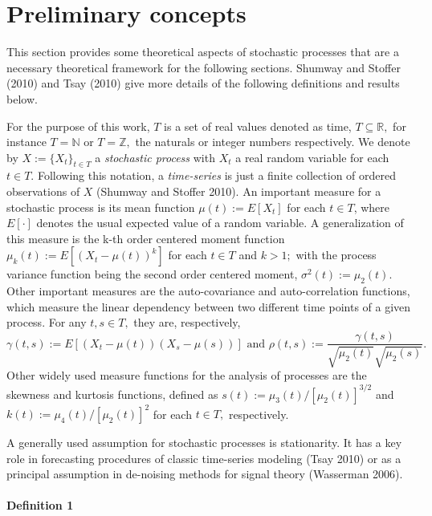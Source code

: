 \hypertarget{preliminary-concepts}{%
\section{Preliminary concepts}\label{preliminary-concepts}}

This section provides some theoretical aspects of stochastic processes that are a necessary theoretical framework for the following sections. Shumway and Stoffer (2010) and Tsay (2010) give more details of the following definitions and results below.

For the purpose of this work, \(T\) is a set of real values denoted as time, \(T \subseteq \mathbb{R},\) for instance \(T=\mathbb{N}\) or \(T=\mathbb{Z},\) the naturals or integer numbers respectively. We denote by \(X:=\{X_t\}_{t\in T}\) a \textit{stochastic process} with \(X_t\) a real random variable for each \(t\in T.\) Following this notation, a \textit{time-series} is just a finite collection of ordered observations of \(X\) (Shumway and Stoffer 2010). An important measure for a stochastic process is its mean function \(\mu(t) := E[X_t]\) for each \(t \in T\), where \(E[\cdot]\) denotes the usual expected value of a random variable. A generalization of this measure is the k-th order centered moment function \(\mu_k(t) := E[(X_t -\mu(t))^k]\) for each \(t \in T\) and \(k > 1;\) with the process variance function being the second order centered moment, \(\sigma^2(t) := \mu_2(t)\). Other important measures are the auto-covariance and auto-correlation functions, which measure the linear dependency between two different time points of a given process. For any \(t,s \in T,\) they are, respectively,
\[
\gamma(t,s) := E[(X_t -\mu(t))(X_s - \mu(s))] \mbox{ and } \rho(t,s) := \dfrac{\gamma(t,s)}{\sqrt{\mu_2(t)}\sqrt{\mu_2(s)}}.
\]
Other widely used measure functions for the analysis of processes are the skewness and kurtosis functions, defined as \(s(t) := \mu_3(t)/[\mu_2(t)]^{3/2}\) and \(k(t) := \mu_4(t)/[\mu_2(t)]^2\) for each \(t\in T,\) respectively.

A generally used assumption for stochastic processes is stationarity. It has a key role in forecasting procedures of classic time-series modeling (Tsay 2010) or as a principal assumption in de-noising methods for signal theory (Wasserman 2006).

\hypertarget{definition-1}{%
\paragraph{Definition 1}\label{definition-1}}


